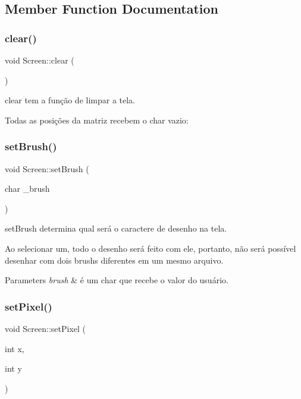 \subsection{Member Function Documentation}
\mbox{\label{class_screen_a35e74266b2a04e37b354ceff7a5f1031}} 
\subsubsection{\texorpdfstring{clear()}{clear()}}
{\footnotesize\ttfamily void Screen\+::clear (\begin{DoxyParamCaption}{ }\end{DoxyParamCaption})}



clear tem a função de limpar a tela. 

Todas as posições da matriz recebem o char vazio\+: \textquotesingle{} \textquotesingle{} \mbox{\label{class_screen_aebc4eb6cb5acf15a0f04c1494622ab23}} 
\subsubsection{\texorpdfstring{set\+Brush()}{setBrush()}}
{\footnotesize\ttfamily void Screen\+::set\+Brush (\begin{DoxyParamCaption}\item[{char}]{\+\_\+brush }\end{DoxyParamCaption})}



set\+Brush determina qual será o caractere de desenho na tela. 

Ao selecionar um, todo o desenho será feito com ele, portanto, não será possível desenhar com dois brushs diferentes em um mesmo arquivo. 
\begin{DoxyParams}{Parameters}
{\em brush} & é um char que recebe o valor do usuário. \\
\hline
\end{DoxyParams}
\mbox{\label{class_screen_ae6bea81c57a22d226507c3c26fa95ee0}} 
\subsubsection{\texorpdfstring{set\+Pixel()}{setPixel()}}
{\footnotesize\ttfamily void Screen\+::set\+Pixel (\begin{DoxyParamCaption}\item[{int}]{x,  }\item[{int}]{y }\end{DoxyParamCaption})}



